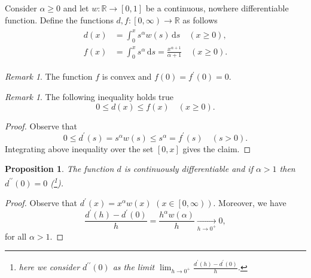 \documentclass[12pt]{article}
\newcommand{\R}{\mathbb{R}}
\newcommand{\dd}{\,\mathrm{d}}
\newcommand{\dprime}{{\prime\prime}}
\renewcommand{\leq}{\leqslant}
\renewcommand{\geq}{\geqslant}
\newcommand{\convto}[2]{\xrightarrow[#2]{#1}}
\newcommand{\paren}[1]{\! \left(#1 \right)}
\newcommand{\bracket}[1]{\! \left[#1 \right]}
\theoremstyle{plain}
\newtheorem{proposition}[theorem]{Proposition}
\theoremstyle{definition}
\theoremstyle{remark}
\newtheorem{remark}[theorem]{Remark}
\begin{document}
Consider $\alpha \geq 0$ and let $w \colon \R \to \bracket{0, 1}$ be a continuous, nowhere differentiable function.
Define the functions $d, f \colon \left[0, \infty\right) \to \R$ as follows
\begin{align} \label{eq::definition_of_d_and_f}
    \begin{split}
        d\paren{x} & = \int_0^x s^\alpha w\paren{s} \dd s \quad \paren{x \geq 0}, \\
        f\paren{x} & = \int_0^x s^\alpha \dd s = \frac{x^{\alpha+1}}{\alpha+1} \quad \paren{x \geq 0}.
    \end{split}
\end{align}

\begin{remark} \label{remark::properties_of_f}
    The function $f$ is convex and $f\paren{0} = f^\prime\paren{0} = 0$.
\end{remark}

\begin{remark} \label{remark::estimate}
    The following inequality holds true
    \begin{equation*}
        0 \leq d\paren{x} \leq f\paren{x} \quad \paren{x \geq 0}.
     \end{equation*}
\end{remark}
\begin{proof}
    Observe that
    \begin{equation*}
        0 \leq d^\prime\paren{s} = s^\alpha w\paren{s} \leq s^\alpha = f^\prime\paren{s} \quad \paren{s > 0}.
    \end{equation*}
    Integrating above inequality over the set $\bracket{0, x}$ gives the claim.
\end{proof}

\begin{proposition} \label{prop::d_is_C1}
    The function $d$ is continuously differentiable and if $\alpha>1$ then $d^\dprime\paren{0} = 0$ (\footnote{here we consider $d^\dprime\paren{0}$ as the limit $\lim_{h \to 0^+} \frac{d^\prime\paren{h} - d^\prime\paren{0}}{h}$.}).
\end{proposition}
\begin{proof}
    Observe that $d^\prime\paren{x} = x^\alpha w\paren{x}$ $\paren{x \in \left[0, \infty\right)}$.
    Moreover, we have
    \begin{equation*}
        \frac{d^\prime\paren{h} - d^\prime\paren{0}}{h} = \frac{h^\alpha w\paren{\alpha}}{h} \convto{}{h \to 0^+} 0,
    \end{equation*}
    for all $\alpha > 1$.
\end{proof}
\end{document}
